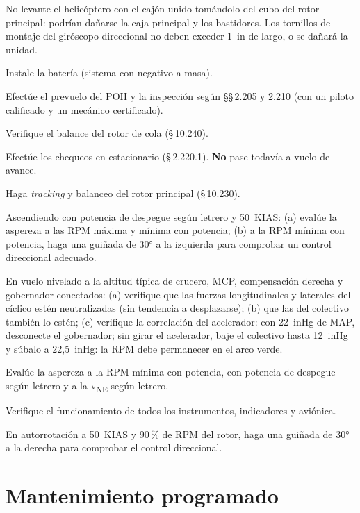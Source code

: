 \begin{precaucion}
No levante el helicóptero con el cajón unido tomándolo del cubo del rotor principal: podrían dañarse la caja principal y los bastidores. Los tornillos de montaje del giróscopo direccional no deben exceder 1~in de largo, o se dañará la unidad.
\end{precaucion}

\begin{pasos}
\setcounter{enumi}{14}
\item Instale la batería (sistema con negativo a masa).
\item Efectúe el prevuelo del POH y la inspección según \S\S\,2.205 y 2.210 (con un piloto calificado y un mecánico certificado).
\item Verifique el balance del rotor de cola (\S\,10.240).
\item Efectúe los chequeos en estacionario (\S\,2.220.1). \textbf{No} pase todavía a vuelo de avance.
\item Haga \emph{tracking} y balanceo del rotor principal (\S\,10.230).
\item Ascendiendo con potencia de despegue según letrero y 50~KIAS: (a) evalúe la aspereza a las RPM máxima y mínima con potencia; (b) a la RPM mínima con potencia, haga una guiñada de 30° a la izquierda para comprobar un control direccional adecuado.
\item En vuelo nivelado a la altitud típica de crucero, MCP, compensación derecha y gobernador conectados: (a) verifique que las fuerzas longitudinales y laterales del cíclico estén neutralizadas (sin tendencia a desplazarse); (b) que las del colectivo también lo estén; (c) verifique la correlación del acelerador: con 22~inHg de MAP, desconecte el gobernador; sin girar el acelerador, baje el colectivo hasta 12~inHg y súbalo a 22,5~inHg: la RPM debe permanecer en el arco verde.
\item Evalúe la aspereza a la RPM mínima con potencia, con potencia de despegue según letrero y a la \textsc{v}\textsubscript{NE} según letrero.
\item Verifique el funcionamiento de todos los instrumentos, indicadores y aviónica.
\item En autorrotación a 50~KIAS y 90\,\% de RPM del rotor, haga una guiñada de 30° a la derecha para comprobar el control direccional.
\end{pasos}

\section{Mantenimiento programado}

